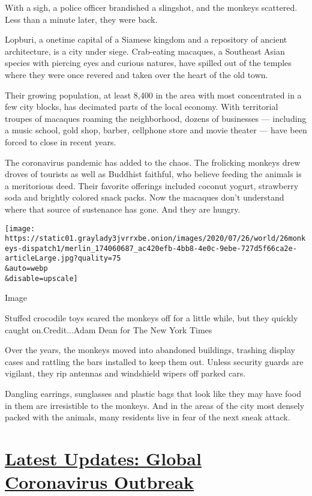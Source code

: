 With a sigh, a police officer brandished a slingshot, and the monkeys
scattered. Less than a minute later, they were back.

Lopburi, a onetime capital of a Siamese kingdom and a repository of
ancient architecture, is a city under siege. Crab-eating macaques, a
Southeast Asian species with piercing eyes and curious natures, have
spilled out of the temples where they were once revered and taken over
the heart of the old town.

Their growing population, at least 8,400 in the area with most
concentrated in a few city blocks, has decimated parts of the local
economy. With territorial troupes of macaques roaming the neighborhood,
dozens of businesses --- including a music school, gold shop, barber,
cellphone store and movie theater --- have been forced to close in
recent years.

The coronavirus pandemic has added to the chaos. The frolicking monkeys
drew droves of tourists as well as Buddhist faithful, who believe
feeding the animals is a meritorious deed. Their favorite offerings
included coconut yogurt, strawberry soda and brightly colored snack
packs. Now the macaques don't understand where that source of sustenance
has gone. And they are hungry.

\texttt{[image: https://static01.graylady3jvrrxbe.onion/images/2020/07/26/world/26monkeys-dispatch1/merlin\_174060687\_ac420efb-4bb8-4e0c-9ebe-727d5f66ca2e-articleLarge.jpg?quality=75\\\&auto=webp\\\&disable=upscale]}

Image

Stuffed crocodile toys scared the monkeys off for a little while, but
they quickly caught on.Credit...Adam Dean for The New York Times

Over the years, the monkeys moved into abandoned buildings, trashing
display cases and rattling the bars installed to keep them out. Unless
security guards are vigilant, they rip antennas and windshield wipers
off parked cars.

Dangling earrings, sunglasses and plastic bags that look like they may
have food in them are irresistible to the monkeys. And in the areas of
the city most densely packed with the animals, many residents live in
fear of the next sneak attack.

\hypertarget{latest-updates-global-coronavirus-outbreak}{%
\section{\texorpdfstring{\href{https://www.nytimes3xbfgragh.onion/2020/08/01/world/coronavirus-covid-19.html?action=click\&pgtype=Article\&state=default\&region=MAIN_CONTENT_1\&context=storylines_live_updates}{Latest
Updates: Global Coronavirus
Outbreak}}{Latest Updates: Global Coronavirus Outbreak}}\label{latest-updates-global-coronavirus-outbreak}}

